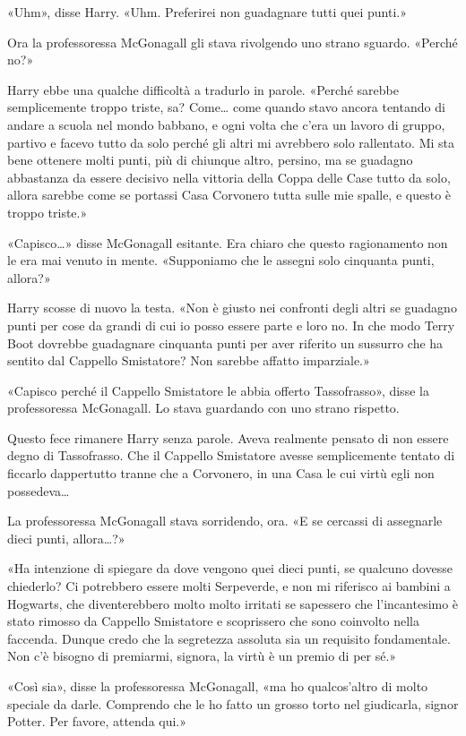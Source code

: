 «Uhm», disse Harry. «Uhm. Preferirei non guadagnare tutti quei punti.»

Ora la professoressa McGonagall gli stava rivolgendo uno strano sguardo. «Perché no?»

Harry ebbe una qualche difficoltà a tradurlo in parole. «Perché sarebbe semplicemente troppo triste, sa? Come… come quando stavo ancora tentando di andare a scuola nel mondo babbano, e ogni volta che c’era un lavoro di gruppo, partivo e facevo tutto da solo perché gli altri mi avrebbero solo rallentato. Mi sta bene ottenere molti punti, più di chiunque altro, persino, ma se guadagno abbastanza da essere decisivo nella vittoria della Coppa delle Case tutto da solo, allora sarebbe come se portassi Casa Corvonero tutta sulle mie spalle, e questo è troppo triste.»

«Capisco…» disse McGonagall esitante. Era chiaro che questo ragionamento non le era mai venuto in mente. «Supponiamo che le assegni solo cinquanta punti, allora?»

Harry scosse di nuovo la testa. «Non è giusto nei confronti degli altri se guadagno punti per cose da grandi di cui io posso essere parte e loro no. In che modo Terry Boot dovrebbe guadagnare cinquanta punti per aver riferito un sussurro che ha sentito dal Cappello Smistatore? Non sarebbe affatto imparziale.»

«Capisco perché il Cappello Smistatore le abbia offerto Tassofrasso», disse la professoressa McGonagall. Lo stava guardando con uno strano rispetto.

Questo fece rimanere Harry senza parole. Aveva realmente pensato di non essere degno di Tassofrasso. Che il Cappello Smistatore avesse semplicemente tentato di ficcarlo dappertutto tranne che a Corvonero, in una Casa le cui virtù egli non possedeva…

La professoressa McGonagall stava sorridendo, ora. «E se cercassi di assegnarle dieci punti, allora…?»

«Ha intenzione di spiegare da dove vengono quei dieci punti, se qualcuno dovesse chiederlo? Ci potrebbero essere molti Serpeverde, e non mi riferisco ai bambini a Hogwarts, che diventerebbero molto molto irritati se sapessero che l’incantesimo è stato rimosso da Cappello Smistatore e scoprissero che sono coinvolto nella faccenda. Dunque credo che la segretezza assoluta sia un requisito fondamentale. Non c’è bisogno di premiarmi, signora, la virtù è un premio di per sé.»

«Così sia», disse la professoressa McGonagall, «ma ho qualcos’altro di molto speciale da darle. Comprendo che le ho fatto un grosso torto nel giudicarla, signor Potter. Per favore, attenda qui.»

